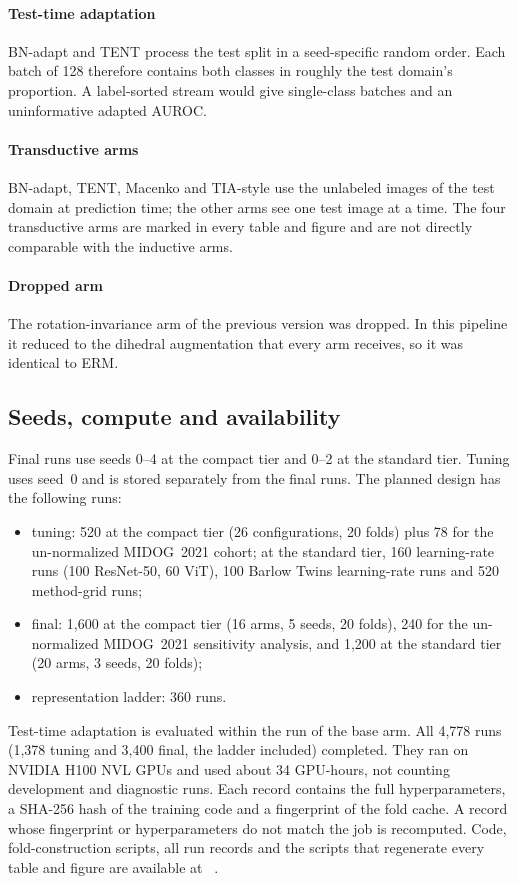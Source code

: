 \paragraph{Test-time adaptation} BN-adapt and TENT process the test split in a
seed-specific random order. Each batch of 128 therefore contains both classes
in roughly the test domain's proportion. A label-sorted stream would give
single-class batches and an uninformative adapted AUROC.

\paragraph{Transductive arms} BN-adapt, TENT, Macenko and TIA-style use the
unlabeled images of the test domain at prediction time; the other arms see one
test image at a time. The four transductive arms are marked in every table and
figure and are not directly comparable with the inductive arms.

\paragraph{Dropped arm} The rotation-invariance arm of the previous version was
dropped. In this pipeline it reduced to the dihedral augmentation that every arm
receives, so it was identical to ERM.

\subsection{Seeds, compute and availability}
\label{sec:setup-compute}

Final runs use seeds 0--4 at the compact tier and 0--2 at the standard tier.
Tuning uses seed~0 and is stored separately from the final runs. The planned
design has the following runs:
\begin{itemize}
  \item tuning: 520 at the compact tier (26 configurations, 20 folds) plus 78
    for the un-normalized MIDOG~2021 cohort; at the standard tier, 160
    learning-rate runs (100 ResNet-50, 60 ViT), 100 Barlow Twins
    learning-rate runs and 520 method-grid runs;
  \item final: 1,600 at the compact tier (16 arms, 5 seeds, 20 folds), 240 for
    the un-normalized MIDOG~2021 sensitivity analysis, and 1,200 at the standard
    tier (20 arms, 3 seeds, 20 folds);
  \item representation ladder: 360 runs.
\end{itemize}
Test-time adaptation is evaluated within the run of the base arm. All 4,778 runs
(1,378 tuning and 3,400 final, the ladder included) completed. They ran on
NVIDIA H100 NVL GPUs and used about 34 GPU-hours, not counting development
and diagnostic runs. Each
record contains the full hyperparameters, a SHA-256 hash of the training code
and a fingerprint of the fold cache. A record whose fingerprint or
hyperparameters do not match the job is recomputed. Code, fold-construction
scripts, all run records and the scripts that regenerate every table and figure
are available at \coderepo\ .
